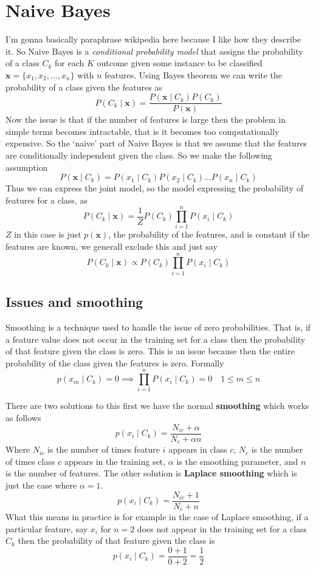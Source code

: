 \documentclass[12pt]{article}
\begin{document}
\section{Naive Bayes}

I'm gonna basically paraphrase wikipedia here because I like how they describe it. So Naive Bayes is a \textit{conditional probability model} that assigns the probability of a class $C_k$ for each $K$ outcome given some instance to be classified $\mathbf x = \{x_1, x_2, \dots, x_n\}$ with $n$ features. Using Bayes theorem we can write the probability of a class given the features as
\[
    P(C_k\mid \mathbf x) = \frac{P(\mathbf x\mid C_k)P(C_k)}{P(\mathbf x)}    
\]
Now the issue is that if the number of features is large then the problem in simple terms becomes intractable, that is it becomes too computationally expensive. So the `naive' part of Naive Bayes is that we assume that the features are conditionally independent given the class. So we make the following assumption 
\[
    P(\mathbf x\mid C_k) = P(x_1\mid C_k)P(x_2\mid C_k)\dots P(x_n\mid C_k)    
\]
Thus we can express the joint model, so the model expressing the probability of features for a class, as 
\[
    P(C_k\mid \mathbf x) = \frac{1}{Z}P(C_k)\prod_{i=1}^{n}P(x_i\mid C_k)
\]
$Z$ in this case is just $p(\mathbf x)$, the probability of the features, and is constant if the features are known, we generall exclude this and just say 
\[
    P(C_k\mid \mathbf x) \propto P(C_k)\prod_{i=1}^{n}P(x_i\mid C_k)    
\]

\subsection{Issues and smoothing}

Smoothing is a technique used to handle the issue of zero probabilities. That is, if a feature value does not occur in the training set for a class then the probability of that feature given the class is zero. This is an issue because then the entire probability of the class given the features is zero. Formally 
\[
    p(x_m\mid C_k) = 0 \implies \prod_{i=1}^{n}P(x_i\mid C_k) = 0 \quad 1\leq m\leq n
\]

There are two solutions to this first we have the normal \textbf{smoothing} which works as follows
\[
    p(x_i\mid C_k) = \frac{N_{ic} + \alpha}{N_c + \alpha n}
\]
Where $N_{ic}$ is the number of times feature $i$ appears in class $c$, $N_c$ is the number of times class $c$ appears in the training set, $\alpha$ is the smoothing parameter, and $n$ is the number of features. The other solution is \textbf{Laplace smoothing} which is just the case where $\alpha = 1$.
\[
    p(x_i\mid C_k) = \frac{N_{ic} + 1}{N_c + n}    
\]
What this means in practice is for example in the case of Laplace smoothing, if a particular feature, say $x_i$ for $n = 2$ does not appear in the training set for a class $C_k$ then the probability of that feature given the class is
\[
    p(x_i\mid C_k) = \frac{0 + 1}{0 + 2} = \frac{1}{2}    
\]
\end{document}
